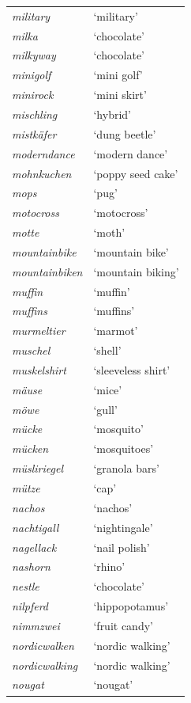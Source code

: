\begin{longtable}{ll}
\textit{military} & `military' \\
\textit{milka} & `chocolate' \\
\textit{milkyway} & `chocolate' \\
\textit{minigolf} & `mini golf' \\
\textit{minirock} & `mini skirt' \\
\textit{mischling} & `hybrid' \\
\textit{mistkäfer} & `dung beetle' \\
\textit{moderndance} & `modern dance' \\
\textit{mohnkuchen} & `poppy seed cake' \\
\textit{mops} & `pug' \\
\textit{motocross} & `motocross' \\
\textit{motte} & `moth' \\
\textit{mountainbike} & `mountain bike' \\
\textit{mountainbiken} & `mountain biking' \\
\textit{muffin} & `muffin' \\
\textit{muffins} & `muffins' \\
\textit{murmeltier} & `marmot' \\
\textit{muschel} & `shell' \\
\textit{muskelshirt} & `sleeveless shirt' \\
\textit{mäuse} & `mice' \\
\textit{möwe} & `gull' \\
\textit{mücke} & `mosquito' \\
\textit{mücken} & `mosquitoes' \\
\textit{müsliriegel} & `granola bars' \\
\textit{mütze} & `cap' \\
\textit{nachos} & `nachos' \\
\textit{nachtigall} & `nightingale' \\
\textit{nagellack} & `nail polish' \\
\textit{nashorn} & `rhino' \\
\textit{nestle} & `chocolate' \\
\textit{nilpferd} & `hippopotamus' \\
\textit{nimmzwei} & `fruit candy' \\
\textit{nordicwalken} & `nordic walking' \\
\textit{nordicwalking} & `nordic walking' \\
\textit{nougat} & `nougat' \\

\end{longtable}
